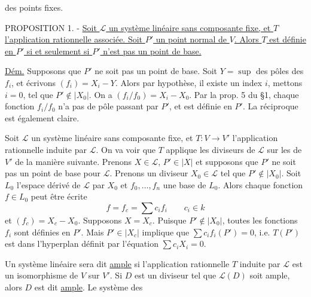 
des points fixes.

PROPOSITION 1. - \uline{Soit $\mathcal{L}$ un système linéaire sans composante fixe, et $T$ l'application rationnelle associée. Soit $P'$ un point normal de $V$. Alors $T$ est définie en $P'$ si et seulement si $P'$ n'est pas un point de base.}

\uline{Dém.} Supposons que $P'$ ne soit pas un point de base. Soit $Y=\sup$ des pôles des $f_i$, et écrivons $(f_i)=X_i-Y$. Alors par hypothèse, il existe un index $i$, mettons $i=0$, tel que $P'\notin|X_0|$. On a $(f_i/f_0)=X_i-X_0$. Par la prop. 5 du \S 1, chaque fonction $f_i/f_0$ n'a pas de pôle passant par $P'$, et est définie en $P'$. La réciproque est également claire.

Soit $\mathcal{L}$ un système linéaire sans composante fixe, et $T:V\longrightarrow V'$ l'application rationnelle induite par $\mathcal{L}$. On va voir que $T$ applique les diviseurs de $\mathcal{L}$ sur les   de $V'$ de la manière suivante. Prenons $X\in\mathcal{L}$, $P'\in|X|$ et supposons que $P'$ ne soit pas un point de base pour $\mathcal{L}$. Prenons un diviseur $X_0\in\mathcal{L}$ tel que $P'\notin|X_0|$. Soit $L_0$ l'espace dérivé de $\mathcal{L}$ par $X_0$ et $f_0,\ldots,f_n$ une base de $L_0$. Alors chaque fonction $f\in L_0$ peut être écrite
\[
f=f_c=\sum c_i f_i\qquad c_i\in k
\]
et $(f_c)=X_c-X_0$. Supposons $X=X_c$. Puisque $P'\notin|X_0|$, toutes les fonctions $f_i$ sont définies en $P'$. Mais $P'\in|X_c|$ implique que $\sum c_i f_i(P')=0$, i.e. $T(P')$ est dans l'hyperplan définit par l'équation $\sum c_i X_i=0$.

Un système linéaire sera dit \uline{ample}  si l'application rationnelle $T$ induite par $\mathcal{L}$ est un isomorphisme de $V$ sur $V'$. Si $D$ est un diviseur tel que $\mathcal{L}(D)$ soit ample, alors $D$ est dit \uline{ample}. Le système des


